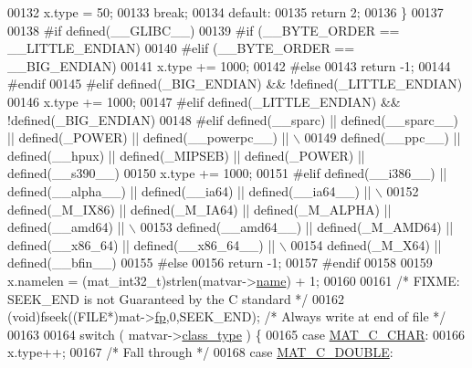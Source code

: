 \begin{DoxyCode}
{00132             x.type = 50;
00133             \textcolor{keywordflow}{break};
00134         \textcolor{keywordflow}{default}:
00135             \textcolor{keywordflow}{return} 2;
00136     \}
00137 
00138 \textcolor{preprocessor}{#if defined(\_\_GLIBC\_\_)}
00139 \textcolor{preprocessor}{#if (\_\_BYTE\_ORDER == \_\_LITTLE\_ENDIAN)}
00140 \textcolor{preprocessor}{#elif (\_\_BYTE\_ORDER == \_\_BIG\_ENDIAN)}
00141     x.type += 1000;
00142 \textcolor{preprocessor}{#else}
00143     \textcolor{keywordflow}{return} -1;
00144 \textcolor{preprocessor}{#endif}
00145 \textcolor{preprocessor}{#elif defined(\_BIG\_ENDIAN) && !defined(\_LITTLE\_ENDIAN)}
00146     x.type += 1000;
00147 \textcolor{preprocessor}{#elif defined(\_LITTLE\_ENDIAN) && !defined(\_BIG\_ENDIAN)}
00148 \textcolor{preprocessor}{#elif defined(\_\_sparc) || defined(\_\_sparc\_\_) || defined(\_POWER) || defined(\_\_powerpc\_\_) || \(\backslash\)}
00149 \textcolor{preprocessor}{      defined(\_\_ppc\_\_) || defined(\_\_hpux) || defined(\_MIPSEB) || defined(\_POWER) || defined(\_\_s390\_\_)}
00150     x.type += 1000;
00151 \textcolor{preprocessor}{#elif defined(\_\_i386\_\_) || defined(\_\_alpha\_\_) || defined(\_\_ia64) || defined(\_\_ia64\_\_) || \(\backslash\)}
00152 \textcolor{preprocessor}{      defined(\_M\_IX86) || defined(\_M\_IA64) || defined(\_M\_ALPHA) || defined(\_\_amd64) || \(\backslash\)}
00153 \textcolor{preprocessor}{      defined(\_\_amd64\_\_) || defined(\_M\_AMD64) || defined(\_\_x86\_64) || defined(\_\_x86\_64\_\_) || \(\backslash\)}
00154 \textcolor{preprocessor}{      defined(\_M\_X64) || defined(\_\_bfin\_\_)}
00155 \textcolor{preprocessor}{#else}
00156     \textcolor{keywordflow}{return} -1;
00157 \textcolor{preprocessor}{#endif}
00158 
00159     x.namelen = (mat\_int32\_t)strlen(matvar->\hyperlink{group___m_a_t_a5d4b55b041e3b4fb50c04337f05ad909}{name}) + 1;
00160 
00161     \textcolor{comment}{/* FIXME: SEEK\_END is not Guaranteed by the C standard */}
00162     (void)fseek((FILE*)mat->\hyperlink{struct__mat__t_a85f562e407ca9ad4d2a6e14f839432b7}{fp},0,SEEK\_END);         \textcolor{comment}{/* Always write at end of file */}
00163 
00164     \textcolor{keywordflow}{switch} ( matvar->\hyperlink{group___m_a_t_aff13035bf3265dd7d9425e5d40c839d4}{class\_type} ) \{
00165         \textcolor{keywordflow}{case} \hyperlink{group___m_a_t_ggad4d60ae7b709fc81bfd744fb4c857c40aacdec5834df0861130b393697646119c}{MAT\_C\_CHAR}:
00166             x.type++;
00167             \textcolor{comment}{/* Fall through */}
00168         \textcolor{keywordflow}{case} \hyperlink{group___m_a_t_ggad4d60ae7b709fc81bfd744fb4c857c40a5d70e0862e5bdb7bd86bf7ba5948f307}{MAT\_C\_DOUBLE}:
}
\end{DoxyCode}
